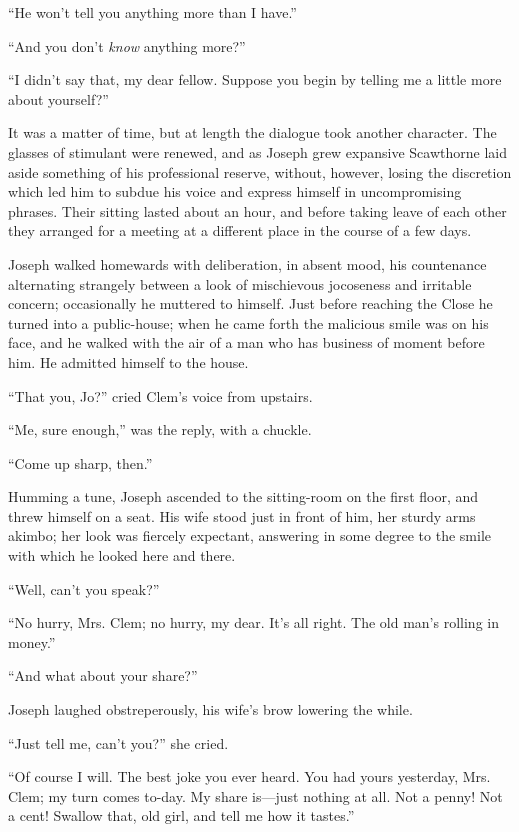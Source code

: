 ``He won't tell you anything more than I have.''

``And you don't \emph{know} anything more?''

``I didn't say that, my dear fellow. Suppose you begin by telling me a
little more about yourself?''

It was a matter of time, but at length the dialogue took another
character. The glasses of stimulant were renewed, and as Joseph grew
expansive Scawthorne laid aside something of his professional reserve,
without, however, losing the discretion which led him to subdue his
voice and express himself in uncompromising phrases. Their sitting
lasted about an hour, and before taking leave of each other they
arranged for a meeting at a different place in the course of a few days.

Joseph walked homewards with deliberation, in absent mood, his
countenance alternating strangely between a look of mischievous
{\protect\hypertarget{93}{}{}}jocoseness and irritable concern;
occasionally he muttered to himself. Just before reaching the Close he
turned into a public-house; when he came forth the malicious smile was
on his face, and he walked with the air of a man who has business of
moment before him. He admitted himself to the house.

``That you, Jo?'' cried Clem's voice from upstairs.

``Me, sure enough,'' was the reply, with a chuckle.

``Come up sharp, then.''

Humming a tune, Joseph ascended to the sitting-room on the first floor,
and threw himself on a seat. His wife stood just in front of him, her
sturdy arms akimbo; her look was fiercely expectant, answering in some
degree to the smile with which he looked here and there.

``Well, can't you speak?''

``No hurry, Mrs. Clem; no hurry, my dear. It's all right. The old man's
rolling in money.''

``And what about your share?''

{\protect\hypertarget{94}{}{}}Joseph laughed obstreperously, his wife's
brow lowering the while.

``Just tell me, can't you?'' she cried.

``Of course I will. The best joke you ever heard. You had yours
yesterday, Mrs. Clem; my turn comes to-day. My share is---just nothing
at all. Not a penny! Not a cent! Swallow that, old girl, and tell me how
it tastes.''

